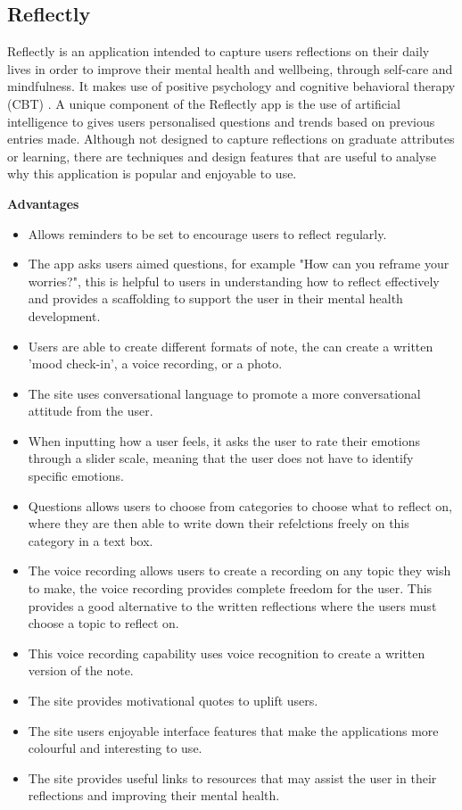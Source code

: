 \documentclass{l4proj}
\begin{document}
\subsection{Reflectly}

Reflectly is an application intended to capture users reflections on their daily lives in order to improve their mental health and wellbeing, through self-care
and mindfulness. It makes use of positive psychology and cognitive behavioral therapy (CBT) \citep{reflectly_app}. 
A unique component of the Reflectly app is the use of artificial intelligence to gives users personalised questions and trends based on previous entries made.
Although not designed to capture reflections on graduate attributes or learning, there are techniques and design features that are useful to analyse why this
application is popular and enjoyable to use. 

\textbf{Advantages}
\begin{itemize}
    \item Allows reminders to be set to encourage users to reflect regularly.
    \item The app asks users aimed questions, for example "How can you reframe your worries?", this is helpful to users in understanding how to reflect effectively
    and provides a scaffolding to support the user in their mental health development.
    \item Users are able to create different formats of note, the can create a written 'mood check-in', a voice recording, or a photo.
    \item The site uses conversational language to promote a more conversational attitude from the user.
    \item When inputting how a user feels, it asks the user to rate their emotions through a slider scale, meaning that the user does not have to identify
    specific emotions. 
    \item Questions allows users to choose from categories to choose what to reflect on, where they are then able to write down their refelctions freely on 
    this category in a text box.
    \item The voice recording allows users to create a recording on any topic they wish to make, the voice recording provides complete freedom for the user. This
    provides a good alternative to the written reflections where the users must choose a topic to reflect on.
    \item This voice recording capability uses voice recognition to create a written version of the note.
    \item The site provides motivational quotes to uplift users.
    \item The site users enjoyable interface features that make the applications more colourful and interesting to use.
    \item The site provides useful links to resources that may assist the user in their reflections and improving their mental health.
\end{itemize}
\end{document}
